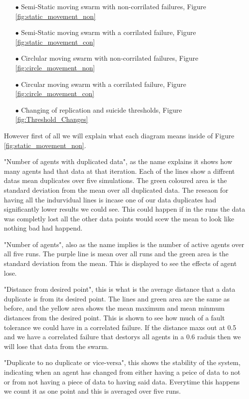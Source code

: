 \documentclass{UoYCSproject}
\begin{document}
\begin{itemize} 
\itemsep-1em 
\item[$\bullet$] Semi-Static moving swarm with non-corrilated failures, Figure \ref{fig:static_movement_non}
\item[$\bullet$] Semi-Static moving swarm with a corrilated failure, Figure \ref{fig:static_movement_con}
\item[$\bullet$] Circlular moving swarm with non-corrilated failures, Figure \ref{fig:circle_movement_non}
\item[$\bullet$] Circular moving swarm with a corrilated failure, Figure \ref{fig:circle_movement_con}
\item[$\bullet$] Changing of replication and suicide thresholds, Figure \ref{fig:Threshold_Changes}
\end{itemize}

However first of all we will explain what each diagram means inside of Figure \ref{fig:static_movement_non}.

"Number of agents with duplicated data", as the name explains it shows how many agents had that data at that iteration.
Each of the lines show a diffrent datas mean duplicates over five simulations.
The green coloured area is the standard deviation from the mean over all duplicated data.
The reseaon for having all the indurvidual lines is incase one of our data duplicates had significantly lower results we could see.
This could happen if in the runs the data was completly lost all the other data points would scew the mean to look like nothing bad had happend.

"Number of agents", also as the name implies is the number of active agents over all five runs.
The purple line is mean over all runs and the green area is the standard deviation from the mean.
This is displayed to see the effects of agent lose.

"Distance from desired point", this is what is the average distance that a data duplicate is from its desired point.
The lines and green area are the same as before, and the yellow area shows the mean maximum and mean minmum distances from the desired point.
This is shown to see how much of a fault tolerance we could have in a correlated failure.
If the distance maxs out at 0.5 and we have a correlated failure that destorys all agents in a 0.6 raduis then we will lose that data from the swarm.

"Duplicate to no duplicate or vice-versa", this shows the stability of the system, indicating when an agent has changed from either having a peice of data to not or from not having a piece of data to having said data.
Everytime this happens we count it as one point and this is averaged over five runs.
\end{document}
